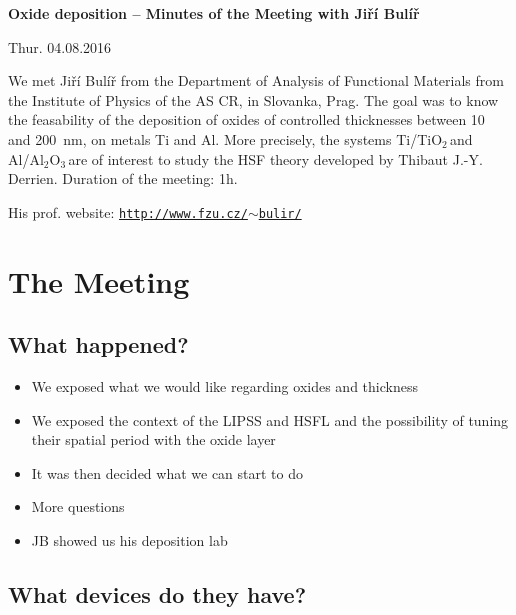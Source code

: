 \documentclass[11pt]{article}
\newcommand{\TiOO}{TiO$_2$\,}
\newcommand{\Alumina}{Al$_2$O$_3$\,}
\begin{document}
\begin{center}
\Large{\textbf{Oxide deposition -- Minutes of the Meeting with Ji\v{r}\'{i} Bul\'{i}\v{r}}}
\end{center}
\begin{center}
\large{Thur. 04.08.2016}
\end{center}
\vspace*{0.5cm}


\begin{center}
We met Ji\v{r}\'{i} Bul\'{i}\v{r} from the Department of Analysis of Functional Materials from the Institute of Physics of the AS CR, in Slovanka, Prag. The goal was to know the feasability of the deposition of oxides of controlled thicknesses between 10 and 200~nm, on metals Ti and Al. More precisely, the systems Ti/\TiOO and Al/\Alumina are of interest to study the HSF theory developed by Thibaut J.-Y. Derrien. Duration of the meeting: 1h.
\end{center}

\begin{center}
His prof. website: \texttt{\href{http://www.fzu.cz/~bulir/}{http://www.fzu.cz/$\sim$bulir/}}
\end{center}

\vspace*{5cm}
\tableofcontents

\pagebreak
\section{The Meeting}

\subsection*{What happened?}

\begin{itemize}
\item We exposed what we would like regarding oxides and thickness
\item We exposed the context of the LIPSS and HSFL and the possibility of tuning their spatial period with the oxide layer
\item It was then decided what we can start to do
\item More questions
\item JB showed us his deposition lab
\end{itemize}

\subsection*{What devices do they have?}
\end{document}
